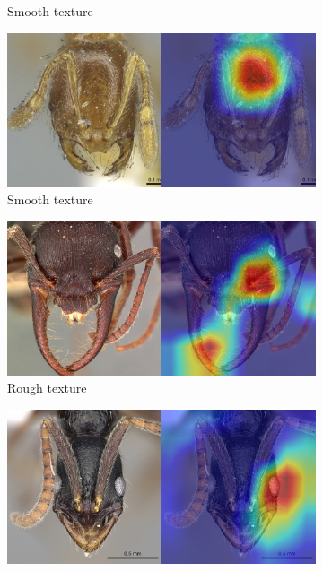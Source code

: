 \documentclass{aci}
\numberwithin{equation}{section}
\begin{document}
\begin{figure}
\begin{subfigure}{\subwidth}
        \caption*{Smooth texture}
        \label{fig:incorrect_ideal_177}
    \end{subfigure}
    \begin{subfigure}{\subwidth}
        \includegraphics[width=1\linewidth]{thesis_assets/gradcam/incorrect_ideal/197.png}
        \caption*{Smooth texture}
        \label{fig:incorrect_ideal_197}
    \end{subfigure}
    \begin{subfigure}{\subwidth}
        \includegraphics[width=1\linewidth]{thesis_assets/gradcam/incorrect_nonideal/1.png}
        \caption*{Rough texture}
        \label{fig:incorrect_nonideal_1}
    \end{subfigure}
    \begin{subfigure}{\subwidth}
        \includegraphics[width=1\linewidth]{thesis_assets/gradcam/incorrect_nonideal/22.png}

\end{subfigure}
\end{figure}
\end{document}
